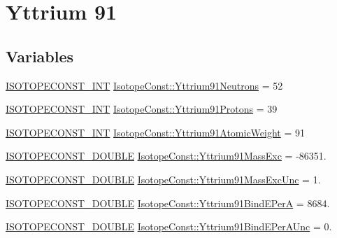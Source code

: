 \hypertarget{group___isotope_const-_yttrium-_y91}{}\section{Yttrium 91}
\label{group___isotope_const-_yttrium-_y91}
\subsection*{Variables}
\begin{DoxyCompactItemize}
\item 
\mbox{\hyperlink{group___isotope_const-_macros_ga5f18360b3e99483a35c32d789e62621c}{I\+S\+O\+T\+O\+P\+E\+C\+O\+N\+S\+T\+\_\+\+I\+NT}} \mbox{\hyperlink{group___isotope_const-_yttrium-_y91_gaa5bb1505d804c5ba72877bfbfdaeb3da}{Isotope\+Const\+::\+Yttrium91\+Neutrons}} = 52
\item 
\mbox{\hyperlink{group___isotope_const-_macros_ga5f18360b3e99483a35c32d789e62621c}{I\+S\+O\+T\+O\+P\+E\+C\+O\+N\+S\+T\+\_\+\+I\+NT}} \mbox{\hyperlink{group___isotope_const-_yttrium-_y91_gaf641ca9f4bbe88832d02cfc9371e1aa2}{Isotope\+Const\+::\+Yttrium91\+Protons}} = 39
\item 
\mbox{\hyperlink{group___isotope_const-_macros_ga5f18360b3e99483a35c32d789e62621c}{I\+S\+O\+T\+O\+P\+E\+C\+O\+N\+S\+T\+\_\+\+I\+NT}} \mbox{\hyperlink{group___isotope_const-_yttrium-_y91_ga362c3454bea2445211ac50bd4309264a}{Isotope\+Const\+::\+Yttrium91\+Atomic\+Weight}} = 91
\item 
\mbox{\hyperlink{group___isotope_const-_macros_ga8f45a7272ce02c0b4c65c44636ed719a}{I\+S\+O\+T\+O\+P\+E\+C\+O\+N\+S\+T\+\_\+\+D\+O\+U\+B\+LE}} \mbox{\hyperlink{group___isotope_const-_yttrium-_y91_ga14a932b1533bd1f49547ec03d40215f6}{Isotope\+Const\+::\+Yttrium91\+Mass\+Exc}} = -\/86351.
\item 
\mbox{\hyperlink{group___isotope_const-_macros_ga8f45a7272ce02c0b4c65c44636ed719a}{I\+S\+O\+T\+O\+P\+E\+C\+O\+N\+S\+T\+\_\+\+D\+O\+U\+B\+LE}} \mbox{\hyperlink{group___isotope_const-_yttrium-_y91_gabcc64cf3acb07a24c07958be768168bd}{Isotope\+Const\+::\+Yttrium91\+Mass\+Exc\+Unc}} = 1.
\item 
\mbox{\hyperlink{group___isotope_const-_macros_ga8f45a7272ce02c0b4c65c44636ed719a}{I\+S\+O\+T\+O\+P\+E\+C\+O\+N\+S\+T\+\_\+\+D\+O\+U\+B\+LE}} \mbox{\hyperlink{group___isotope_const-_yttrium-_y91_ga1b4b5f4d983c933faec9dfbc7515972e}{Isotope\+Const\+::\+Yttrium91\+Bind\+E\+PerA}} = 8684.
\item 
\mbox{\hyperlink{group___isotope_const-_macros_ga8f45a7272ce02c0b4c65c44636ed719a}{I\+S\+O\+T\+O\+P\+E\+C\+O\+N\+S\+T\+\_\+\+D\+O\+U\+B\+LE}} \mbox{\hyperlink{group___isotope_const-_yttrium-_y91_ga4e390befb3833e8fa3ed3a1b447fadda}{Isotope\+Const\+::\+Yttrium91\+Bind\+E\+Per\+A\+Unc}} = 0.

\end{DoxyCompactItemize}
